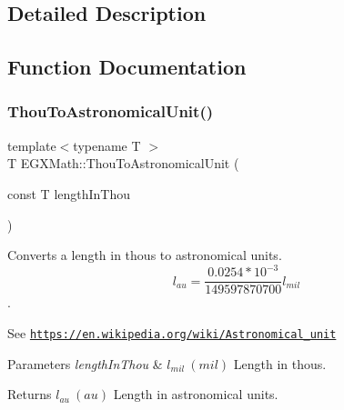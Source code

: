 \subsection{Detailed Description}


\subsection{Function Documentation}
\mbox{\label{group___e_g_x_math-_conversions-_length_conversions-_imperial-_thou-_astronomical_gaf6e57bc733c3644d4ca1a6c0bb836b42}} 
\subsubsection{\texorpdfstring{Thou\+To\+Astronomical\+Unit()}{ThouToAstronomicalUnit()}}
{\footnotesize\ttfamily template$<$typename T $>$ \\
T E\+G\+X\+Math\+::\+Thou\+To\+Astronomical\+Unit (\begin{DoxyParamCaption}\item[{const T}]{length\+In\+Thou }\end{DoxyParamCaption})}



Converts a length in thous to astronomical units. \[ l_{au}=\frac{0.0254 * 10^{-3}}{149597870700} l_{mil} \]. 

See \href{https://en.wikipedia.org/wiki/Astronomical_unit}{\tt https\+://en.\+wikipedia.\+org/wiki/\+Astronomical\+\_\+unit} 
\begin{DoxyParams}{Parameters}
{\em length\+In\+Thou} & $ l_{mil}\ (mil)$ Length in thous. \\
\hline
\end{DoxyParams}
\begin{DoxyReturn}{Returns}
$ l_{au}\ (au)$ Length in astronomical units. 
\end{DoxyReturn}
\mbox{\label{group___e_g_x_math-_conversions-_length_conversions-_imperial-_thou-_astronomical_gab36cdfc79de8c7cde7dedb7b08a6323e}} 
